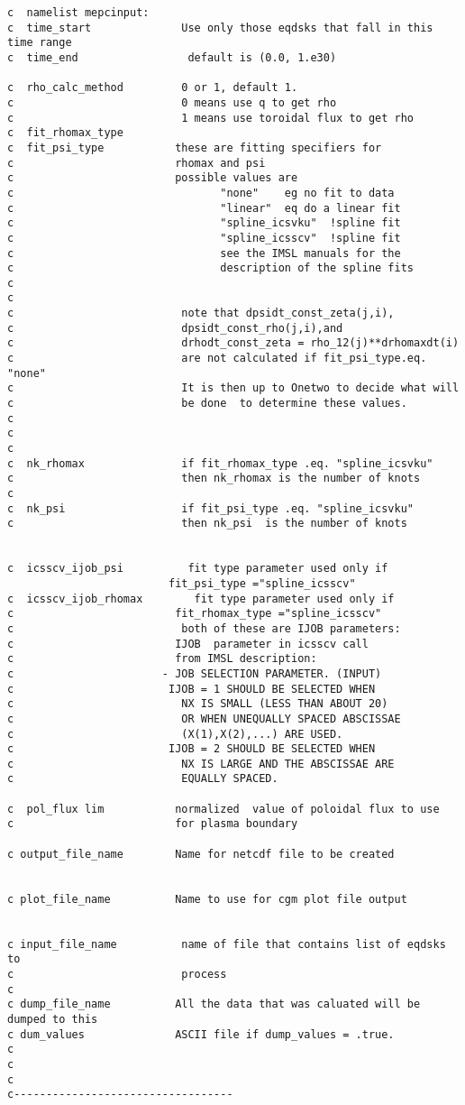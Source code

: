 \documentclass[12pt]{article}
\begin{document}
    \begin{verbatim}
c  namelist mepcinput:
c  time_start              Use only those eqdsks that fall in this time range
c  time_end                 default is (0.0, 1.e30)

c  rho_calc_method         0 or 1, default 1. 
c                          0 means use q to get rho
c                          1 means use toroidal flux to get rho
c  fit_rhomax_type
c  fit_psi_type           these are fitting specifiers for
c                         rhomax and psi
c                         possible values are
c                                "none"    eg no fit to data
c                                "linear"  eq do a linear fit
c                                "spline_icsvku"  !spline fit
c                                "spline_icsscv"  !spline fit
c                                see the IMSL manuals for the
c                                description of the spline fits
c  
c
c                          note that dpsidt_const_zeta(j,i), 
c                          dpsidt_const_rho(j,i),and 
c                          drhodt_const_zeta = rho_12(j)**drhomaxdt(i)
c                          are not calculated if fit_psi_type.eq. "none"
c                          It is then up to Onetwo to decide what will
c                          be done  to determine these values.
c
c
c
c  nk_rhomax               if fit_rhomax_type .eq. "spline_icsvku"
c                          then nk_rhomax is the number of knots
c
c  nk_psi                  if fit_psi_type .eq. "spline_icsvku"
c                          then nk_psi  is the number of knots


c  icsscv_ijob_psi          fit type parameter used only if 
                         fit_psi_type ="spline_icsscv"
c  icsscv_ijob_rhomax        fit type parameter used only if 
c                         fit_rhomax_type ="spline_icsscv"
c                          both of these are IJOB parameters:
c                         IJOB  parameter in icsscv call       
c                         from IMSL description:
c                       - JOB SELECTION PARAMETER. (INPUT)
c                        IJOB = 1 SHOULD BE SELECTED WHEN
c                          NX IS SMALL (LESS THAN ABOUT 20)
c                          OR WHEN UNEQUALLY SPACED ABSCISSAE
c                          (X(1),X(2),...) ARE USED.
c                        IJOB = 2 SHOULD BE SELECTED WHEN
c                          NX IS LARGE AND THE ABSCISSAE ARE
c                          EQUALLY SPACED.

c  pol_flux lim           normalized  value of poloidal flux to use
c                         for plasma boundary

c output_file_name        Name for netcdf file to be created


c plot_file_name          Name to use for cgm plot file output


c input_file_name          name of file that contains list of eqdsks to 
c                          process
c
c dump_file_name          All the data that was caluated will be dumped to this
c dum_values              ASCII file if dump_values = .true.
c
c
c
c----------------------------------
    \end{verbatim}
\end{document}
